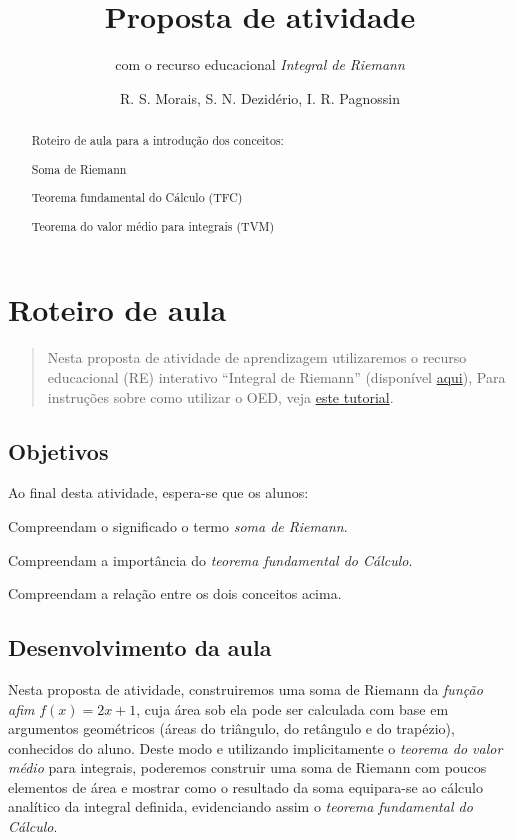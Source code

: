\documentclass[a4paper,12pt]{scrartcl}
\title{Proposta de atividade}
\subtitle{com o recurso educacional \emph{Integral de Riemann}}
\author{R. S. Morais, S. N. Dezidério, I. R. Pagnossin}
\begin{document}
\maketitle

\begin{abstract}
  Roteiro de aula para a introdução dos conceitos:
  \begin{compactitem}
   \item Soma de Riemann
   \item Teorema fundamental do Cálculo (TFC)
   \item Teorema do valor médio para integrais (TVM)
  \end{compactitem}
\end{abstract}

\section*{Roteiro de aula}

  \begin{quotation}
    Nesta proposta de atividade de aprendizagem utilizaremos o recurso educacional (RE) interativo ``Integral de Riemann'' (disponível \href{http://cepa-usp.github.io/AI-0170/}{aqui}),  Para instruções sobre como utilizar o OED, veja \href{http://www.youtube.com/watch?v=PJlPleMYuG4&t=22}{este tutorial}.
  \end{quotation}
  
  \subsection*{Objetivos}
  
    Ao final desta atividade, espera-se que os alunos:
    \begin{compactitem}
      \item Compreendam o significado o termo \emph{soma de Riemann}.
      \item Compreendam a importância do \emph{teorema fundamental do Cálculo}.
      \item Compreendam a relação entre os dois conceitos acima.
    \end{compactitem}

  \subsection*{Desenvolvimento da aula}
  
    Nesta proposta de atividade, construiremos uma soma de Riemann da \emph{função afim} $f(x) = 2x + 1$, cuja área sob ela pode ser calculada com base em argumentos geométricos (áreas do triângulo, do retângulo e do trapézio), conhecidos do aluno. Deste modo e utilizando implicitamente o \emph{teorema do valor médio} para integrais, poderemos construir uma soma de Riemann com poucos elementos de área e mostrar como o resultado da soma equipara-se ao cálculo analítico da integral definida, evidenciando assim o \emph{teorema fundamental do Cálculo}.
    
\end{document}

